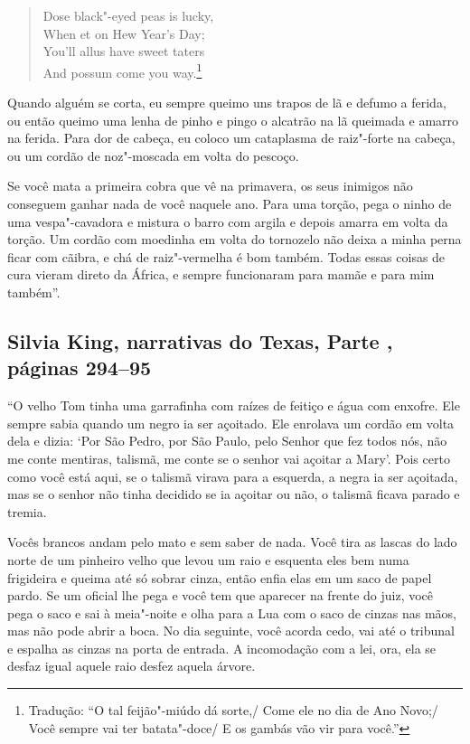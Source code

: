 \begin{verse}
Dose black"-eyed peas is lucky,\\
When et on Hew Year's Day;\\
You'll allus have sweet taters\\ 
And possum come you way.\footnote{Tradução: ``O tal feijão"-miúdo dá sorte,/ Come ele no dia de Ano Novo;/ Você sempre vai ter batata"-doce/ E os gambás vão vir para você.''}
\end{verse}

Quando alguém se corta, eu sempre queimo uns trapos de lã e defumo a
ferida, ou então queimo uma lenha de pinho e pingo o alcatrão na lã
queimada e amarro na ferida. Para dor de cabeça, eu coloco um cataplasma
de raiz"-forte na cabeça, ou um cordão de noz"-moscada em volta do
pescoço.

Se você mata a primeira cobra que vê na primavera, os seus inimigos não
conseguem ganhar nada de você naquele ano. Para uma torção, pega o ninho
de uma vespa"-cavadora e mistura o barro com argila e depois amarra em
volta da torção. Um cordão com moedinha em volta do tornozelo não deixa
a minha perna ficar com cãibra, e chá de raiz"-vermelha é bom também.
Todas essas coisas de cura vieram direto da África, e sempre funcionaram
para mamãe e para mim também''.

\subsection{Silvia King, narrativas do Texas, Parte , páginas 294--95}
\label{ref167}

``O velho Tom tinha uma garrafinha com raízes de feitiço e água com
enxofre. Ele sempre sabia quando um negro ia ser açoitado. Ele enrolava
um cordão em volta dela e dizia: `Por São Pedro, por São Paulo, pelo
Senhor que fez todos nós, não me conte mentiras, talismã, me conte se o
senhor vai açoitar a Mary'. Pois certo como você está aqui, se o talismã
virava para a esquerda, a negra ia ser açoitada, mas se o senhor não
tinha decidido se ia açoitar ou não, o talismã ficava parado e tremia.

Vocês brancos andam pelo mato e sem saber de nada. Você tira as lascas
do lado norte de um pinheiro velho que levou um raio e esquenta eles bem
numa frigideira e queima até só sobrar cinza, então enfia elas em um
saco de papel pardo. Se um oficial lhe pega e você tem que aparecer na
frente do juiz, você pega o saco e sai à meia"-noite e olha para a Lua
com o saco de cinzas nas mãos, mas não pode abrir a boca. No dia
seguinte, você acorda cedo, vai até o tribunal e espalha as cinzas na
porta de entrada. A incomodação com a lei, ora, ela se desfaz igual
aquele raio desfez aquela árvore.


